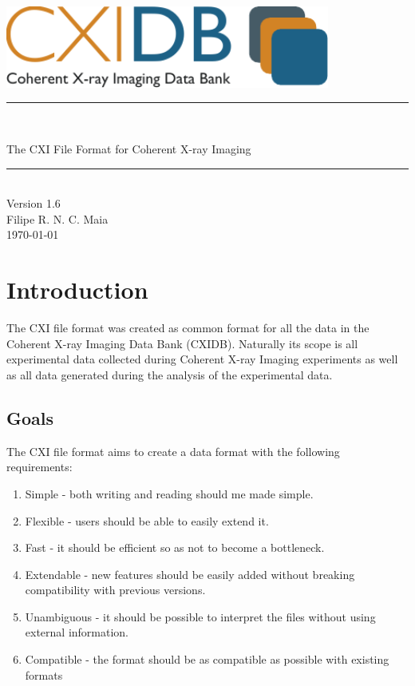 \documentclass[usletter,11pt]{article}
\newcommand{\HRule}{{\color{brightOrange} \rule{\linewidth}{0.5mm}}}
\begin{document}
\begin{center}
\vspace*{2.5cm}
\includegraphics[width=0.8\textwidth]{cxidb_logo_large.pdf}\\[2.0cm]

\HRule \\[0.6cm]
\begin{spacing}{2.0}
{\color{softBlue} \Huge \sffamily The CXI File Format for Coherent
 X-ray Imaging}\\[0.2cm]
\end{spacing}
\HRule \\[1.0cm]
{\Large \color{softBlue} \sffamily Version 1.6}\\[4.5cm]

{\Large \color{softBlue} \sffamily Filipe R. N. C. Maia}\\[0.3cm]
{\Large \color{softBlue} \sffamily \today}
\thispagestyle{empty}
\end{center}

\pagebreak

\thispagestyle{fancy}

\tableofcontents

\pagebreak



\setcounter{page}{1}

\section{Introduction}
The CXI file format was created as common format for all the data in the Coherent X-ray Imaging Data Bank (CXIDB).
Naturally its scope is all experimental data collected during Coherent X-ray Imaging experiments as well as all data generated during the analysis of the experimental data.

\subsection{Goals}
The CXI file format aims to create a data format with the following requirements:
\begin{enumerate}
\item{Simple - both writing and reading should me made simple.}
\item{Flexible - users should be able to easily extend it.}
\item{Fast - it should be efficient so as not to become a bottleneck.}
\item{Extendable - new features should be easily added without breaking compatibility with previous versions.}
\item{Unambiguous - it should be possible to interpret the files without using external information.}
\item{Compatible - the format should be as compatible as possible with existing formats}
\end{enumerate}
\end{document}
